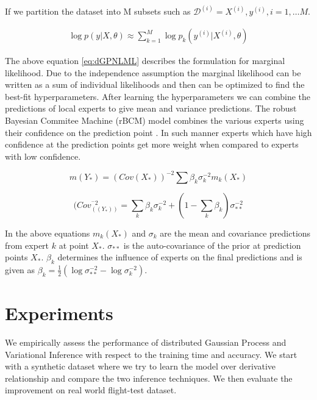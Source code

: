 If we partition the dataset into M subsets such as $\mathcal{D}^{(i)} = {X^{(i)}, y^{(i)}}, i = 1, \ldots M$. 

\begin{align}\label{eq:dGPNLML}
    \log p(y| X, \theta) \approx \sum_{k=1}^{M} \log p_{k}(y^{(i)}| X^{(i)}, \theta)
 \end{align}

The above equation \ref{eq:dGPNLML} describes the formulation for marginal likelihood. Due to the independence assumption the marginal likelihood can be written as a sum of individual likelihoods and then can be optimized to find the best-fit hyperparameters. After learning the hyperparameters we can combine the predictions of local experts to give mean and variance predictions. The robust Bayesian Commitee Machine (rBCM) model combines the various experts using their confidence on the prediction point \cite{deisenroth2015distributed}. In such manner experts which have high confidence at the prediction points get more weight when compared to experts with low confidence. 

\begin{equation}\label{eq:meanDGP}
    m(Y_{*}) = (Cov(X_{*}))^{-2}\sum \beta_{k}\sigma_{k}^{-2}m_{k}(X_{*})
\end{equation}

\begin{equation}
    (Cov_((Y_{*}))^{^-2} = \sum_{k} \beta_{k}\sigma_{k}^{-2} + (1- \sum_{k} \beta_{k})\sigma^{-2}_{**}
\end{equation}

In the above equations \(m_{k}(X_{*})\) and \(\sigma_{k}\) are the mean and covariance predictions from expert \(k\) at point \(X_{*}\). \(\sigma_{**}\) is the auto-covariance of the prior at prediction points \(X_{*}\). \(\beta_{k}\) determines the influence of experts on the final predictions \cite{DBLP:journals/corr/CaoF14} and is given as \(\beta_{k} = \frac{1}{2}(\log\sigma_{**}^{-2} - \log\sigma_{k}^{-2})\).  

\section{Experiments}\label{sec:experiments}
\noindent We empirically assess the performance of distributed Gaussian Process and Variational Inference with respect to the training time and accuracy. We start with a synthetic dataset where we try to learn the model over derivative relationship and compare the two inference techniques. We then evaluate the improvement on real world flight-test dataset.

